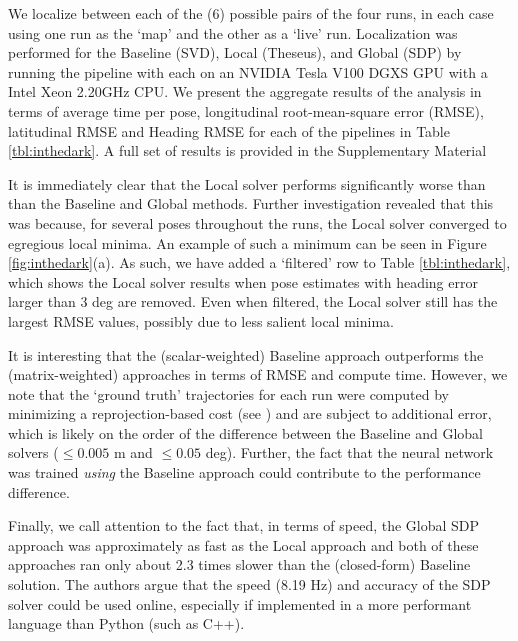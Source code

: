 \documentclass[lettersize,journal]{IEEEtran}
\begin{document}
We localize between each of the (6) possible pairs of the four runs, in each case using one run as the `map' and the other as a `live' run. Localization was performed for the Baseline (SVD), Local (Theseus), and Global (SDP) by running the pipeline with each on an NVIDIA Tesla V100 DGXS GPU with a Intel Xeon 2.20GHz CPU. We present the aggregate results of the analysis in terms of average time per pose, longitudinal root-mean-square error (RMSE), latitudinal RMSE and Heading RMSE for each of the pipelines in Table \ref{tbl:inthedark}. A full set of results is provided in the Supplementary Material 

It is immediately clear that the Local solver performs significantly worse than than the Baseline and Global methods. Further investigation revealed that this was because, for several poses throughout the runs, the Local solver converged to egregious local minima. An example of such a minimum can be seen in Figure \ref{fig:inthedark}(a). As such, we have added a `filtered' row to Table \ref{tbl:inthedark}, which shows the Local solver results when pose estimates with heading error larger than 3 deg are removed. Even when filtered, the Local solver still has the largest RMSE values, possibly due to less salient local minima.

It is interesting that the (scalar-weighted) Baseline approach outperforms the (matrix-weighted) approaches in terms of RMSE and compute time. However, we note that the `ground truth' trajectories for each run were computed by minimizing a reprojection-based cost (see \cite{patonBridgingAppearanceGap2016a}) and are subject to additional error, which is likely on the order of the difference between the Baseline and Global solvers ($\leq0.005$ m and $\leq0.05$ deg). Further, the fact that the neural network was trained \emph{using} the Baseline approach could contribute to the performance difference.

Finally, we call attention to the fact that, in terms of speed, the Global SDP approach was approximately as fast as the Local approach and both of these approaches ran only about 2.3 times slower than the (closed-form) Baseline solution. The authors argue that the speed (8.19 Hz) and accuracy of the SDP solver could be used online, especially if implemented in a more performant language than Python (such as C++).
\end{document}
